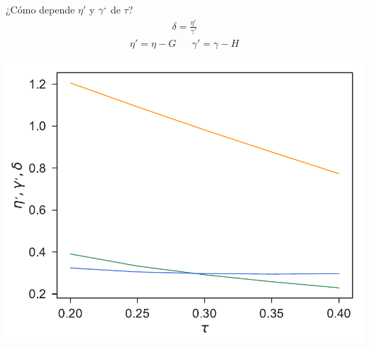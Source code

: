\documentclass{beamer}
\begin{document}
\begin{frame}{¿Cómo depende $\eta'$ y $\gamma`$ de $\tau$?}
  \begin{align}
    \delta=\frac{\eta'}{\gamma'}
    \nonumber
  \end{align}
  \begin{align}
    \eta'=\eta-G && \gamma'=\gamma-H
   \nonumber 
  \end{align}
  \begin{center}
\includegraphics[scale=0.41]{tauDependenceSlip-17nodes-WALLS}
  \end{center}
\end{frame}
\end{document}
